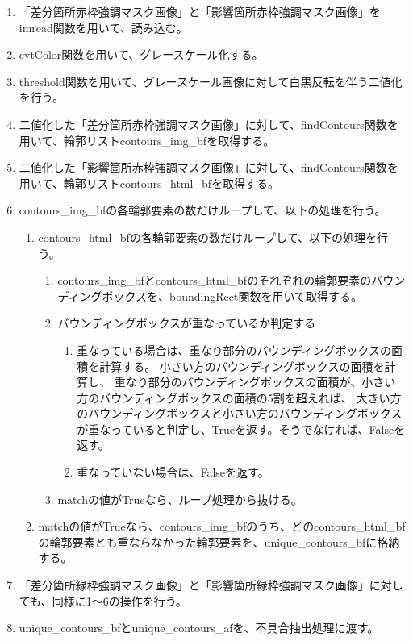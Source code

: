 \begin{enumerate}
    \item 「差分箇所赤枠強調マスク画像」と「影響箇所赤枠強調マスク画像」をimread関数を用いて、読み込む。
    \item cvtColor関数を用いて、グレースケール化する。
    \item threshold関数を用いて、グレースケール画像に対して白黒反転を伴う二値化を行う。
    \item 二値化した「差分箇所赤枠強調マスク画像」に対して、findContours関数を用いて、輪郭リストcontours\_img\_bfを取得する。
    \item 二値化した「影響箇所赤枠強調マスク画像」に対して、findContours関数を用いて、輪郭リストcontours\_html\_bfを取得する。
    \item contours\_img\_bfの各輪郭要素の数だけループして、以下の処理を行う。
          \begin{enumerate}
              \item contours\_html\_bfの各輪郭要素の数だけループして、以下の処理を行う。
                    \begin{enumerate}
                        \item contours\_img\_bfとcontours\_html\_bfのそれぞれの輪郭要素のバウンディングボックスを、boundingRect関数を用いて取得する。
                        \item バウンディングボックスが重なっているか判定する
                              \begin{enumerate}
                                  \item  重なっている場合は、重なり部分のバウンディングボックスの面積を計算する。
                                        小さい方のバウンディングボックスの面積を計算し、
                                        重なり部分のバウンディングボックスの面積が、小さい方のバウンディングボックスの面積の5割を超えれば、
                                        大きい方のバウンディングボックスと小さい方のバウンディングボックスが重なっていると判定し、Trueを返す。そうでなければ、Falseを返す。
                                  \item 重なっていない場合は、Falseを返す。
                              \end{enumerate}
                        \item matchの値がTrueなら、ループ処理から抜ける。
                    \end{enumerate}
              \item matchの値がTrueなら、contours\_img\_bfのうち、どのcontours\_html\_bfの輪郭要素とも重ならなかった輪郭要素を、unique\_contours\_bfに格納する。
          \end{enumerate}
    \item 「差分箇所緑枠強調マスク画像」と「影響箇所緑枠強調マスク画像」に対しても、同様に1～6の操作を行う。
    \item unique\_contours\_bfとunique\_contours\_afを、不具合抽出処理に渡す。
\end{enumerate}

